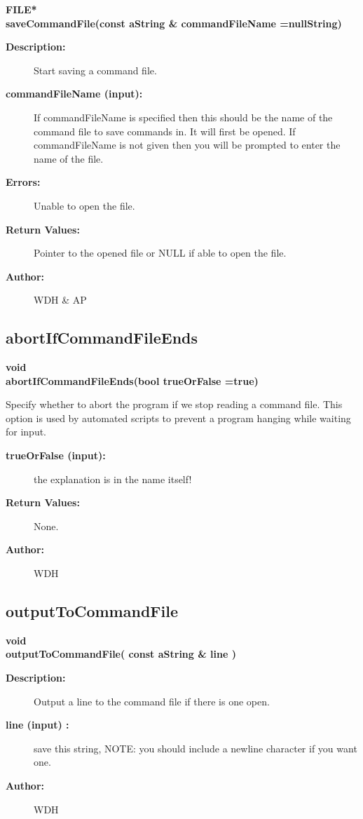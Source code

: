 \begin{flushleft} \textbf{%
FILE*  \\ 
\settowidth{\GenericGraphicsInterfaceIncludeArgIndent}{saveCommandFile(}%
saveCommandFile(const aString \& commandFileName  =nullString)
}\end{flushleft}
\begin{description}
\item[{\bf Description:}] 
    Start saving a command file. 
\item[{\bf commandFileName (input):}] 
    If {\ff commandFileName} is specified
    then this should be the name of the command file to save commands in. It will
    first be opened. If  {\ff commandFileName} is not given then
    you will be prompted to enter the name of the file.
\item[{\bf Errors:}]  Unable to open the file.
\item[{\bf Return Values:}]  Pointer to the opened file or NULL if able to open the file.

\item[{\bf Author:}]  WDH \& AP
\end{description}
\subsection{abortIfCommandFileEnds}
 
\begin{flushleft} \textbf{%
void  \\ 
\settowidth{\GenericGraphicsInterfaceIncludeArgIndent}{abortIfCommandFileEnds(}%
abortIfCommandFileEnds(bool trueOrFalse  =true)
}\end{flushleft}
  Specify whether to abort the program if we stop reading a command file.
  This option is used by automated scripts to prevent a program hanging while
  waiting for input.
\begin{description}
\item[{\bf trueOrFalse (input):}]  the explanation is in the name itself!
\item[{\bf Return Values:}]  None.
\item[{\bf Author:}]  WDH
\end{description}
\subsection{outputToCommandFile}
 
\begin{flushleft} \textbf{%
void  \\ 
\settowidth{\GenericGraphicsInterfaceIncludeArgIndent}{outputToCommandFile(}%
outputToCommandFile( const aString \& line )
}\end{flushleft}
\begin{description}
\item[{\bf Description:}] 
     Output a line to the command file if there is one open.
\item[{\bf line (input) :}]  save this string, NOTE: you should include a newline character if you want one.
\item[{\bf Author:}]  WDH
\end{description}
